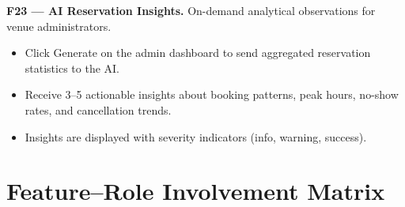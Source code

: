 \documentclass[12pt,a4paper]{article}
\begin{document}
\textbf{F23 --- AI Reservation Insights.}
On-demand analytical observations for venue administrators.
\begin{itemize}[leftmargin=1.5em, topsep=2pt, itemsep=1pt]
    \item Click Generate on the admin dashboard to send aggregated reservation
          statistics to the AI.
    \item Receive 3--5 actionable insights about booking patterns, peak hours,
          no-show rates, and cancellation trends.
    \item Insights are displayed with severity indicators (info, warning,
          success).
\end{itemize}

\section{Feature--Role Involvement Matrix}
\end{document}
